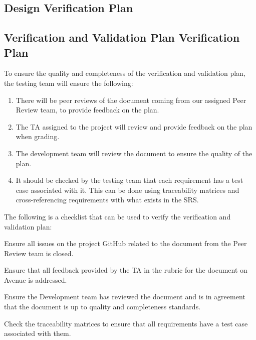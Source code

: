 \documentclass[12pt, titlepage]{article}
\begin{document}
\subsection{Design Verification Plan}




\subsection{Verification and Validation Plan Verification Plan}

To ensure the quality and completeness of the verification and
validation plan, the testing team will ensure the following:

\begin{enumerate}
  \item There will be peer reviews of the document coming from our
    assigned Peer Review team, to provide feedback on the plan.
  \item The TA assigned to the project will review and provide
    feedback on the plan when grading.
  \item The development team will review the document to ensure the
    quality of the plan.
  \item It should be checked by the testing team that each
    requirement has a test case associated with it. This can be done
    using traceability matrices and cross-referencing requirements
    with what exists in the SRS.
\end{enumerate}

The following is a checklist that can be used to verify the
verification and validation plan:
\begin{todolist}
\item Ensure all issues on the project GitHub related to the document
  from the Peer Review team is closed.
\item Ensure that all feedback provided by the TA in the rubric for
  the document on Avenue is addressed.
\item Ensure the Development team has reviewed the document and is in
  agreement that the document is up to quality and completeness standards.
\item Check the traceability matrices to ensure that all requirements
  have a test case associated with them.
\end{todolist}
\end{document}
